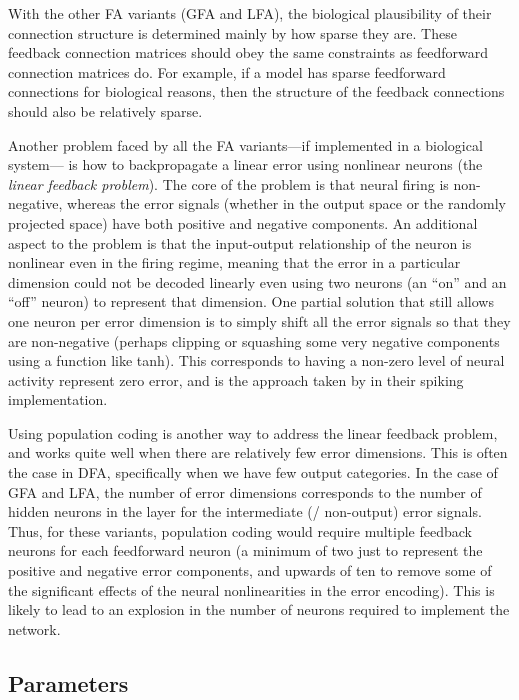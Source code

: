 With the other FA variants (GFA and LFA),
the biological plausibility of their connection structure
is determined mainly by how sparse they are.
These feedback connection matrices should obey the same constraints
as feedforward connection matrices do.
For example, if a model has sparse feedforward connections for biological reasons,
then the structure of the feedback connections should also be relatively sparse.

Another problem faced by all the FA variants---if implemented in a biological system---%
is how to backpropagate a linear error using nonlinear neurons
(the \emph{linear feedback problem}).
The core of the problem is that neural firing is non-negative,
whereas the error signals (whether in the output space or the randomly projected space)
have both positive and negative components.
An additional aspect to the problem is that the input-output relationship
of the neuron is nonlinear even in the firing regime,
meaning that the error in a particular dimension could not be decoded linearly
even using two neurons (an ``on'' and an ``off'' neuron)
to represent that dimension.
One partial solution that still allows one neuron per error dimension
is to simply shift all the error signals so that they are non-negative
(perhaps clipping or squashing some very negative components
using a function like \textrm{tanh}).
This corresponds to having a non-zero level of neural activity
represent zero error,
and is the approach taken by \textcite{Lillicrap2016}
in their spiking implementation.

Using population coding is another way to address the linear feedback problem,
and works quite well when there are relatively few error dimensions.
This is often the case in DFA, specifically when we have few output categories.
In the case of GFA and LFA,
the number of error dimensions corresponds to
the number of hidden neurons in the layer
for the intermediate (\ie/ non-output) error signals.
Thus, for these variants, population coding would require
multiple feedback neurons for each feedforward neuron
(a minimum of two just to represent the positive and negative error components,
and upwards of ten to remove some of the significant effects of the neural
nonlinearities in the error encoding).
This is likely to lead to an explosion in the number of neurons
required to implement the network.


\subsection{Parameters}

